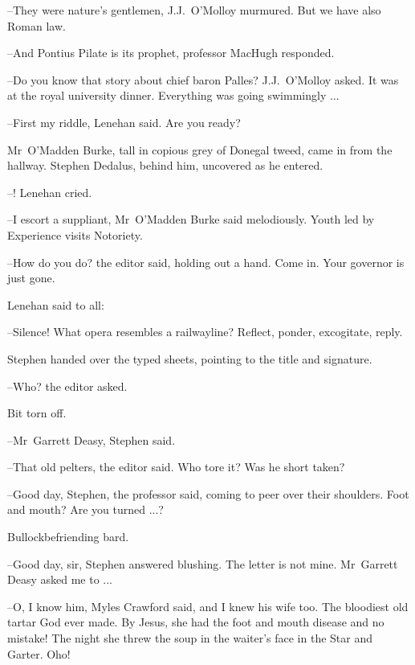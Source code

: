 --They were nature's gentlemen,
J.J.~O'Molloy murmured.
But we have also Roman law.

--And Pontius Pilate is its prophet,
professor MacHugh responded.

--Do you know that story about chief baron Palles?
J.J.~O'Molloy asked.
It was at the royal university dinner.
Everything was going swimmingly ...

--First my riddle,
Lenehan said.
Are you ready?

Mr~O'Madden Burke,
tall in copious grey of Donegal tweed,
came in from the hallway.
Stephen Dedalus,
behind him,
uncovered as he entered.

--!
Lenehan cried.

--I escort a suppliant,
Mr~O'Madden Burke said melodiously.
Youth led by Experience visits Notoriety.

--How do you do?
the editor said,
holding out a hand.
Come in.
Your governor is just gone.



Lenehan said to all:

--Silence!
What opera resembles a railwayline?
Reflect,
ponder,
excogitate,
reply.

Stephen handed over the typed sheets,
pointing to the title and signature.

--Who?
the editor asked.

Bit torn off.

--Mr~Garrett Deasy,
Stephen said.

--That old pelters,
the editor said.
Who tore it?
Was he short taken?



--Good day, Stephen,
the professor said,
coming to peer over their shoulders.
Foot and mouth?
Are you turned ...?

Bullockbefriending bard.



--Good day, sir,
Stephen answered blushing.
The letter is not mine.
Mr~Garrett Deasy asked me to ...

--O, I know him,
Myles Crawford said,
and I knew his wife too.
The bloodiest old tartar God ever made.
By Jesus,
she had the foot and mouth disease
and no mistake!
The night she threw the soup in the waiter's face in the Star and Garter.
Oho!

